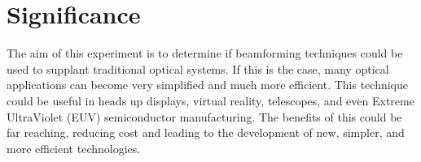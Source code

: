 \documentclass[12pt]{article}
\begin{document}
\section{Significance}
The aim of this experiment is to determine if beamforming techniques could be used to supplant
traditional optical systems. If this is the case, many optical applications can become
very simplified and much more efficient. This technique could be useful in heads up displays,
virtual reality, telescopes, and even Extreme UltraViolet (EUV) semiconductor manufacturing. The
benefits of this could be far reaching, reducing cost and leading to the development of new, simpler,
and more efficient technologies.




\end{document}
